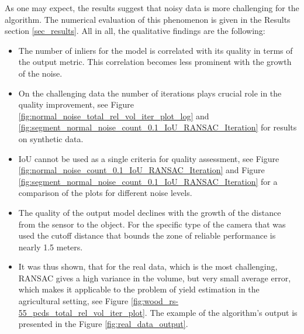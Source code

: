 As one may expect, the results suggest that noisy data is more challenging for the algorithm.
The numerical evaluation of this phenomenon is given in the Results section \ref{sec_results}.
All in all, the qualitative findings are the following:
\begin{itemize}
  \item The number of inliers for the model is correlated with its quality in terms of the output metric. This correlation becomes less prominent with the growth of the noise.
  \item On the challenging data the number of iterations plays crucial role in the quality improvement, see Figure \ref{fig:normal_noise_total_rel_vol_iter_plot_log} and \ref{fig:segment_normal_noise_count_0.1_IoU_RANSAC_Iteration} for results on synthetic data.
  \item IoU cannot be used as a single criteria for quality assessment, see Figure \ref{fig:normal_noise_count_0.1_IoU_RANSAC_Iteration} and Figure \ref{fig:segment_normal_noise_count_0.1_IoU_RANSAC_Iteration} for a comparison of the plots for different noise levels.
  \item The quality of the output model declines with the growth of the distance from the sensor to the object. For the specific type of the camera that was used the cutoff distance that bounds the zone of reliable performance is nearly 1.5 meters.
  \item It was thus shown, that for the real data, which is the most challenging, RANSAC gives a high variance in the volume, but very small average error, which makes it applicable to the problem of yield estimation in the agricultural setting, see Figure \ref{fig:wood_rs-55_pcds_total_rel_vol_iter_plot}. The example of the algorithm's output is presented in the Figure \ref{fig:real_data_output}.
\end{itemize}


\printbibliography


